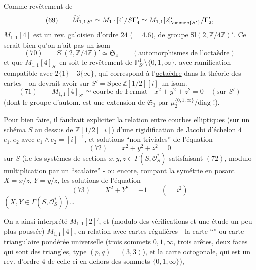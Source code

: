 Comme revêtement de 
\[
(69)\qquad
\widetilde M_{1,1\,S'}
\simeq M_{1,1}[4]/S\Gamma'_4
\simeq M_{1,1}[2]'_{\unsure{S'}}/\Gamma'_2,
\]
$M_{1,1}[4]$ est un rev. galoisien d'ordre $24$ ($=4.6$),
de groupe $\mathrm{Sl}(2,\mathbb Z/4\mathbb Z)'$.
 Ce serait bien  qu'on n'ait pas un isom
\[
(70)\qquad
\mathrm{Sl}(2,\mathbb Z/4\mathbb Z)'
\simeq\mathfrak S_4
\qquad
(\text{automorphismes de l'octaèdre})
\]
et que $M_{1,1}[4]_{S'}$ en soit le revêtement 
de $\mathbb P^1_{S'}\setminus\{0,1,\infty\}$, avec
ramification compatible avec
$2\{1\}$  $+3\{\infty\}$,
qui correspond à l'\uline{octaèdre} \unsure{\&} dans la théorie des
cartes - on devrait avoir sur
$S'=\mathrm{Spec}\,\mathbb Z[1/2][i]$
un isom. 
\[
(71)\qquad
M_{1,1}[4]_{S'}\simeq
\text{courbe de Fermat}
\quad
x^2+y^2+z^2=0
\quad(\text{sur }S')
\]
(dont le groupe d'autom. est  une extension de
$\mathfrak S_3$ par
$\mu_2^{\{0,1,\infty\}}/\mathrm{diag}$ !).

Pour bien faire, il faudrait expliciter la relation entre courbes
elliptiques  (sur un schéma $S$ au dessus de
$\mathbb Z[1/2][i]$)  d'une rigidification de Jacobi
d'échelon $4$ $e_1,e_2$ avec $e_1\wedge e_2=[i]^{-1}$, et solutions
``non triviales'' de l'équation
\[
(72)\qquad x^2+y^2+z^2=0
\]
sur $S$ (i.e les systèmes de sections
$x,y,z\in\Gamma(S,\mathcal O_S^*)$ satisfaisant $(72)$, modulo
multiplication par un ``scalaire''
- ou encore, rompant la symétrie en posant
$X=x/z$, $Y=y/z$, 
les solutions de l'équation
\[
(73)\qquad X^2+Y^2=-1\qquad(=i^2)
\]
$(X,Y\in\Gamma(S,\mathcal O_S^*))$\ldots

On a ainsi interprété $M_{1,1}[2]'$, et
(modulo des vérifications et une étude un peu plus poussée)
$M_{1,1}[4]$, en relation avec  cartes
régulières - la carte ``''
ou carte triangulaire pondérée universelle
(trois sommets $0,1,\infty$,
trois arêtes, deux faces qui sont des triangles, type
$(p,q)=(3,3)$), et la carte \uline{octogonale},
qui est un rev. d'ordre $4$ de celle-ci
\unsure{(}
en dehors des sommets $\{0,1,\infty\}$),

